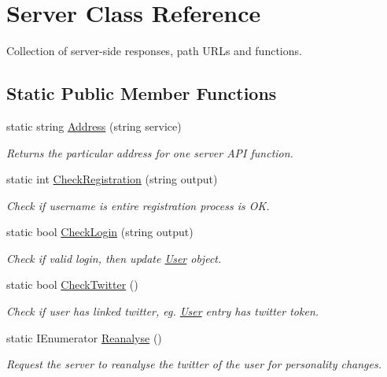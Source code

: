 \hypertarget{class_server}{}\section{Server Class Reference}
\label{class_server}


Collection of server-\/side responses, path U\+R\+Ls and functions.  


\subsection*{Static Public Member Functions}
\begin{DoxyCompactItemize}
\item 
static string \mbox{\hyperlink{class_server_a0a701ca3c73b238ca8808eb05897988c}{Address}} (string service)
\begin{DoxyCompactList}\small\item\em Returns the particular address for one server A\+PI function. \end{DoxyCompactList}\item 
static int \mbox{\hyperlink{class_server_a4fe4bf9d73c95a59d6f2b07faf93c7a2}{Check\+Registration}} (string output)
\begin{DoxyCompactList}\small\item\em Check if username is entire registration process is OK. \end{DoxyCompactList}\item 
static bool \mbox{\hyperlink{class_server_a14b1c4d9f09ef86474d7675abce7258a}{Check\+Login}} (string output)
\begin{DoxyCompactList}\small\item\em Check if valid login, then update \mbox{\hyperlink{class_user}{User}} object. \end{DoxyCompactList}\item 
static bool \mbox{\hyperlink{class_server_aaf401398cccdc041ad7bb2a64c8323f8}{Check\+Twitter}} ()
\begin{DoxyCompactList}\small\item\em Check if user has linked twitter, eg. \mbox{\hyperlink{class_user}{User}} entry has twitter token. \end{DoxyCompactList}\item 
static I\+Enumerator \mbox{\hyperlink{class_server_ae77fb220463cc2e8a103b90aeb4e80bb}{Reanalyse}} ()
\begin{DoxyCompactList}\small\item\em Request the server to reanalyse the twitter of the user for personality changes. \end{DoxyCompactList}\item 

\end{DoxyCompactItemize}
